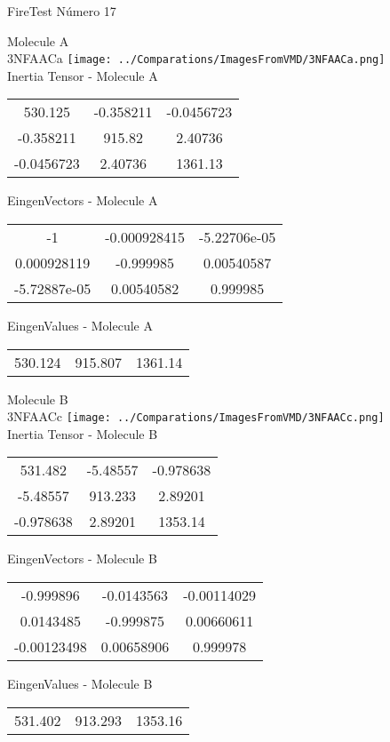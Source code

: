 \vtab[-2cm]
\begin{center}
{\large FireTest \tab Número 17}
\end{center}
\begin{multicols}{2}
\begin{center}

Molecule A \\ 
3NFAACa
\texttt{[image: ../Comparations/ImagesFromVMD/3NFAACa.png]}
\\
Inertia Tensor - Molecule A \\
\vtab

\begin{tabular}{|c c c|}
530.125	 & 	-0.358211	 & 	-0.0456723	 \\
-0.358211	 & 	915.82	 & 	2.40736	 \\
-0.0456723	 & 	2.40736	 & 	1361.13
\end{tabular}

\vtab
 EingenVectors - Molecule A     \\
\vtab
\begin{tabular}{|c c c|}
-1	 & 	-0.000928415	 & 	-5.22706e-05	 \\
0.000928119	 & 	-0.999985	 & 	0.00540587	 \\
-5.72887e-05	 & 	0.00540582	 & 	0.999985
\end{tabular}

\vtab
 EingenValues - Molecule A     \\
\vtab
\begin{tabular}{|c c c|}
530.124	 & 	915.807	 & 	1361.14	 \\
\end{tabular}
\columnbreak

Molecule B \\ 
3NFAACc
\texttt{[image: ../Comparations/ImagesFromVMD/3NFAACc.png]}
\\
Inertia Tensor - Molecule B \\
\vtab

\begin{tabular}{|c c c|}
531.482	 & 	-5.48557	 & 	-0.978638	 \\
-5.48557	 & 	913.233	 & 	2.89201	 \\
-0.978638	 & 	2.89201	 & 	1353.14
\end{tabular}

\vtab
 EingenVectors - Molecule B     \\
\vtab
\begin{tabular}{|c c c|}
-0.999896	 & 	-0.0143563	 & 	-0.00114029	 \\
0.0143485	 & 	-0.999875	 & 	0.00660611	 \\
-0.00123498	 & 	0.00658906	 & 	0.999978
\end{tabular}

\vtab
 EingenValues - Molecule B     \\
\vtab
\begin{tabular}{|c c c|}
531.402	 & 	913.293	 & 	1353.16	 \\
\end{tabular}

\end{center}
\end{multicols}
